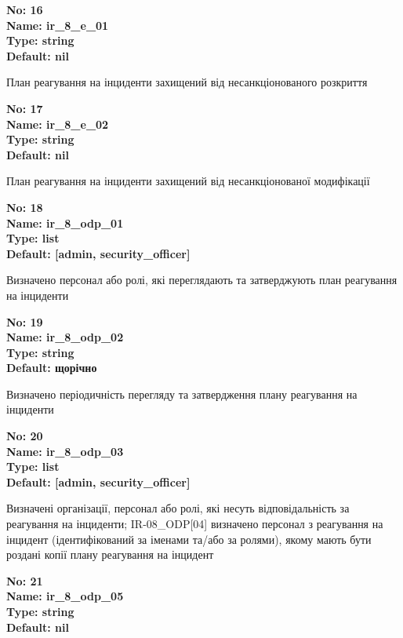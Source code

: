 \documentclass{article}
\begin{document}
{\footnotesize\bfseries
No: 16\\
Name: ir\_\allowbreak{}8\_\allowbreak{}e\_\allowbreak{}01\\
Type: string\\
Default: nil
}

{\footnotesize План реагування на інциденти захищений від несанкціонованого розкриття}


{\footnotesize\bfseries
No: 17\\
Name: ir\_\allowbreak{}8\_\allowbreak{}e\_\allowbreak{}02\\
Type: string\\
Default: nil
}

{\footnotesize План реагування на інциденти захищений від несанкціонованої модифікації}


{\footnotesize\bfseries
No: 18\\
Name: ir\_\allowbreak{}8\_\allowbreak{}odp\_\allowbreak{}01\\
Type: list\\
Default: [\textquotedbl{}admin\textquotedbl{}, \textquotedbl{}security\_\allowbreak{}officer\textquotedbl{}]
}

{\footnotesize Визначено персонал або ролі, які переглядають та затверджують план реагування на інциденти}


{\footnotesize\bfseries
No: 19\\
Name: ir\_\allowbreak{}8\_\allowbreak{}odp\_\allowbreak{}02\\
Type: string\\
Default: \textquotedbl{}щорічно\textquotedbl{}
}

{\footnotesize Визначено періодичність перегляду та затвердження плану реагування на інциденти}


{\footnotesize\bfseries
No: 20\\
Name: ir\_\allowbreak{}8\_\allowbreak{}odp\_\allowbreak{}03\\
Type: list\\
Default: [\textquotedbl{}admin\textquotedbl{}, \textquotedbl{}security\_\allowbreak{}officer\textquotedbl{}]
}

{\footnotesize Визначені організації, персонал або ролі, які несуть відповідальність за реагування на інциденти; IR-08\_\allowbreak{}ODP[04] визначено персонал з реагування на інцидент (ідентифікований за іменами та/або за ролями), якому мають бути роздані копії плану реагування на інцидент}


{\footnotesize\bfseries
No: 21\\
Name: ir\_\allowbreak{}8\_\allowbreak{}odp\_\allowbreak{}05\\
Type: string\\
Default: nil
}
\end{document}
